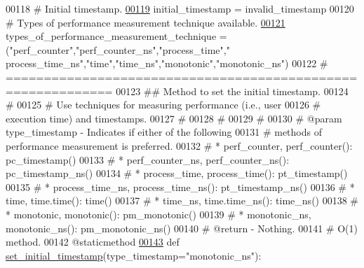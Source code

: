 \begin{DoxyCode}
00118     \textcolor{comment}{# Initial timestamp.}
\hypertarget{performance__measurement_8py_source_l00119}{}\hyperlink{classutilities_1_1timing__measurements_1_1performance__measurement_1_1execution__time__measurement_ac60d39fb6affbaa3d6eb2792c41ee7ff}{00119}     initial\_timestamp = invalid\_timestamp
00120     \textcolor{comment}{# Types of performance measurement technique available.}
\hypertarget{performance__measurement_8py_source_l00121}{}\hyperlink{classutilities_1_1timing__measurements_1_1performance__measurement_1_1execution__time__measurement_a80ff3ce9b405f5d8c2e63294348ca6dc}{00121}     types\_of\_performance\_measurement\_technique = (\textcolor{stringliteral}{"perf\_counter"},\textcolor{stringliteral}{"perf\_counter\_ns"},\textcolor{stringliteral}{"process\_time"},\textcolor{stringliteral}{"
      process\_time\_ns"},\textcolor{stringliteral}{"time"},\textcolor{stringliteral}{"time\_ns"},\textcolor{stringliteral}{"monotonic"},\textcolor{stringliteral}{"monotonic\_ns"})
00122     \textcolor{comment}{# ============================================================}
00123     \textcolor{comment}{##  Method to set the initial timestamp.}
00124     \textcolor{comment}{#}
00125     \textcolor{comment}{#   Use techniques for measuring performance (i.e., user}
00126     \textcolor{comment}{#       execution time) and timestamps.}
00127     \textcolor{comment}{#}
00128     \textcolor{comment}{#}
00129     \textcolor{comment}{#}
00130     \textcolor{comment}{#   @param type\_timestamp - Indicates if either of the following}
00131     \textcolor{comment}{#               methods of performance measurement is preferred.}
00132     \textcolor{comment}{#               * perf\_counter, perf\_counter(): pc\_timestamp()}
00133     \textcolor{comment}{#               * perf\_counter\_ns, perf\_counter\_ns(): pc\_timestamp\_ns()}
00134     \textcolor{comment}{#               * process\_time, process\_time(): pt\_timestamp()}
00135     \textcolor{comment}{#               * process\_time\_ns, process\_time\_ns(): pt\_timestamp\_ns()}
00136     \textcolor{comment}{#               * time, time.time(): time()}
00137     \textcolor{comment}{#               * time\_ns, time.time\_ns(): time\_ns()}
00138     \textcolor{comment}{#               * monotonic, monotonic(): pm\_monotonic()}
00139     \textcolor{comment}{#               * monotonic\_ns, monotonic\_ns(): pm\_monotonic\_ns()}
00140     \textcolor{comment}{#   @return - Nothing.}
00141     \textcolor{comment}{#   O(1) method.}
00142     @staticmethod
\hypertarget{performance__measurement_8py_source_l00143}{}\hyperlink{classutilities_1_1timing__measurements_1_1performance__measurement_1_1execution__time__measurement_aa82fdf41b58ed820066c6f74450a2e66}{00143}     \textcolor{keyword}{def }\hyperlink{classutilities_1_1timing__measurements_1_1performance__measurement_1_1execution__time__measurement_aa82fdf41b58ed820066c6f74450a2e66}{set\_initial\_timestamp}(type\_timestamp="monotonic\_ns"):

\end{DoxyCode}
